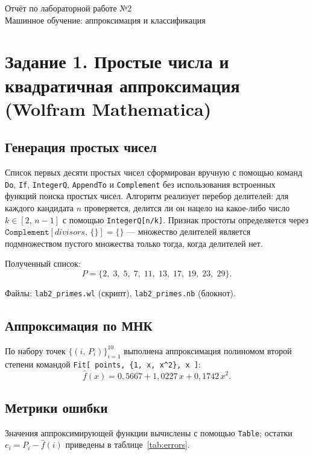 \documentclass[12pt]{article}
\begin{document}
\begin{center}
{\Large Отчёт по лабораторной работе №2}\\[4pt]
{\large Машинное обучение: аппроксимация и классификация}
\end{center}

\section{Задание 1. Простые числа и квадратичная аппроксимация (Wolfram Mathematica)}

\subsection{Генерация простых чисел}

Список первых десяти простых чисел сформирован вручную с помощью команд
\texttt{Do}, \texttt{If}, \texttt{IntegerQ}, \texttt{AppendTo} и
\texttt{Complement} без использования встроенных функций поиска простых чисел.
Алгоритм реализует перебор делителей: для каждого кандидата $n$ проверяется,
делится ли он нацело на какое-либо число $k \in [2,\, n{-}1]$ с помощью
\texttt{IntegerQ[n/k]}. Признак простоты определяется через
$\texttt{Complement}[\mathit{divisors},\,\{\}] = \{\}$ — множество делителей
является подмножеством пустого множества только тогда, когда делителей нет.

Полученный список:
\[
  P = \{2,\; 3,\; 5,\; 7,\; 11,\; 13,\; 17,\; 19,\; 23,\; 29\}.
\]

Файлы: \texttt{lab2\_primes.wl} (скрипт), \texttt{lab2\_primes.nb} (блокнот).

\subsection{Аппроксимация по МНК}

По набору точек $\{(i,\, P_i)\}_{i=1}^{10}$ выполнена аппроксимация полиномом
второй степени командой \texttt{Fit[\,points,\,\{1,\,x,\,x\^{}2\},\,x\,]}:
\[
  \hat{f}(x) = 0{,}5667 + 1{,}0227\,x + 0{,}1742\,x^2.
\]

\subsection{Метрики ошибки}

Значения аппроксимирующей функции вычислены с помощью \texttt{Table}; остатки
$e_i = P_i - \hat{f}(i)$ приведены в таблице~\ref{tab:errors}.
\end{document}
